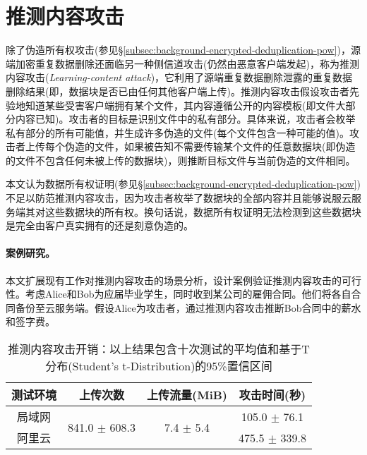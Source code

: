 \section{推测内容攻击}
\label{sec:featurespy-attack}

除了伪造所有权攻击(参见\S\ref{subsec:background-encrypted-deduplication-pow})，源端加密重复数据删除还面临另一种侧信道攻击(仍然由恶意客户端发起)，称为推测内容攻击(\textit{Learning-content attack})，它利用了源端重复数据删除泄露的重复数据删除结果(即，数据块是否已由任何其他客户端上传)。推测内容攻击假设攻击者先验地知道某些受害客户端拥有某个文件，其内容遵循公开的内容模板(即文件大部分内容已知)。攻击者的目标是识别文件中的私有部分。具体来说，攻击者会枚举私有部分的所有可能值，并生成许多伪造的文件(每个文件包含一种可能的值)。攻击者上传每个伪造的文件，如果被告知不需要传输某个文件的任意数据块(即伪造的文件不包含任何未被上传的数据块)，则推断目标文件与当前伪造的文件相同。

本文认为数据所有权证明(参见\S\ref{subsec:background-encrypted-deduplication-pow})不足以防范推测内容攻击，因为攻击者枚举了数据块的全部内容并且能够说服云服务端其对这些数据块的所有权。换句话说，数据所有权证明无法检测到这些数据块是完全由客户真实拥有的还是刻意伪造的。

\paragraph*{案例研究。}
本文扩展现有工作对推测内容攻击的场景分析，设计案例验证推测内容攻击的可行性。考虑Alice和Bob为应届毕业学生，同时收到某公司的雇佣合同。他们将各自合同备份至云服务端。假设Alice为攻击者，通过推测内容攻击推断Bob合同中的薪水和签字费。

\begin{table}[!htb]
    \small
    \centering
    \caption{推测内容攻击开销：以上结果包含十次测试的平均值和基于T分布(Student's t-Distribution)的95\%置信区间}
    \label{tab:LRI-verify}
    \begin{tabular}{@{}cccc@{}}
        \toprule
        测试环境 & 上传次数                           & 上传流量(MiB)                  & 攻击时间(秒)      \\ \midrule
        局域网   & \multirow{2}{*}{841.0 $\pm$ 608.3} & \multirow{2}{*}{7.4 $\pm$ 5.4} & 105.0 $\pm$ 76.1  \\
        阿里云   &                                    &                                & 475.5 $\pm$ 339.8 \\
        \bottomrule
    \end{tabular}
\end{table}

